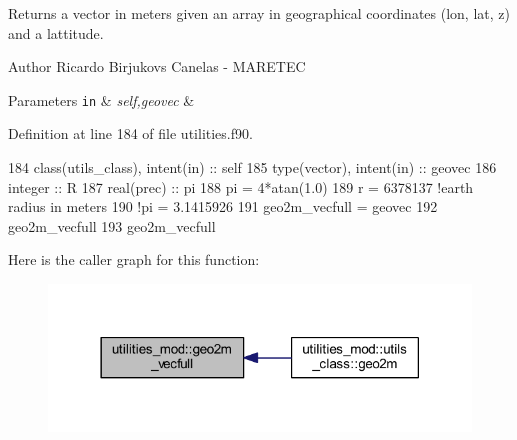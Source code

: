 Returns a vector in meters given an array in geographical coordinates (lon, lat, z) and a lattitude. 

\begin{DoxyAuthor}{Author}
Ricardo Birjukovs Canelas -\/ M\+A\+R\+E\+T\+EC 
\end{DoxyAuthor}

\begin{DoxyParams}[1]{Parameters}
\mbox{\tt in}  & {\em self,geovec} & \\
\hline
\end{DoxyParams}


Definition at line 184 of file utilities.\+f90.


\begin{DoxyCode}
184     \textcolor{keywordtype}{class}(utils\_class), \textcolor{keywordtype}{intent(in)} :: self
185     \textcolor{keywordtype}{type}(vector), \textcolor{keywordtype}{intent(in)} :: geovec
186     \textcolor{keywordtype}{integer} :: R
187     \textcolor{keywordtype}{real(prec)} :: pi
188     pi = 4*atan(1.0)
189     r = 6378137 \textcolor{comment}{!earth radius in meters}
190     \textcolor{comment}{!pi = 3.1415926}
191     geo2m\_vecfull = geovec
192     geo2m\_vecfull%
193     geo2m\_vecfull%
\end{DoxyCode}
Here is the caller graph for this function\+:\nopagebreak
\begin{figure}[H]
\begin{center}
\leavevmode
\includegraphics[width=318pt]{namespaceutilities__mod_ad0d629861220adba81d8622aa16f39ab_icgraph}
\end{center}
\end{figure}
\mbox{\label{namespaceutilities__mod_a164054d89c012d95f63c12a6cc0ac8d7}} 
